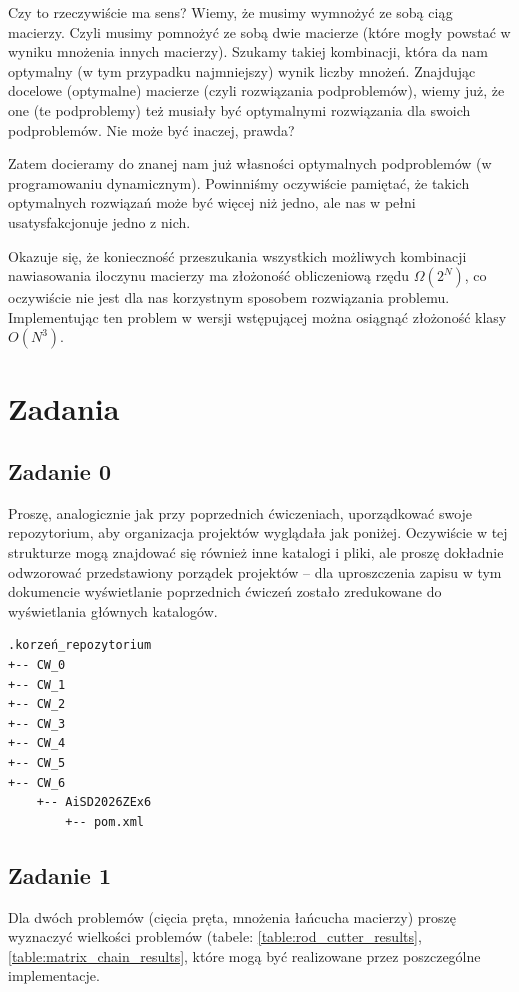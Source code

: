 \documentclass[twoside]{article}
\begin{document}
Czy to rzeczywiście ma sens?
Wiemy, że musimy wymnożyć ze sobą ciąg macierzy. Czyli musimy pomnożyć ze sobą dwie macierze (które 
mogły powstać w wyniku mnożenia innych macierzy). Szukamy takiej kombinacji, która da nam optymalny 
(w tym przypadku najmniejszy) wynik liczby mnożeń. Znajdując docelowe (optymalne) macierze (czyli 
rozwiązania podproblemów), wiemy już, że one (te podproblemy) też musiały być optymalnymi rozwiązania dla swoich podproblemów.
Nie może być inaczej, prawda?

Zatem docieramy do znanej nam już własności optymalnych podproblemów (w programowaniu dynamicznym).
Powinniśmy oczywiście pamiętać, że takich optymalnych rozwiązań może być więcej niż jedno, ale nas w pełni usatysfakcjonuje jedno z nich.

Okazuje się, że konieczność przeszukania wszystkich możliwych kombinacji nawiasowania iloczynu 
macierzy ma złożoność obliczeniową rzędu $\Omega(2^N)$, co oczywiście nie jest dla nas korzystnym 
sposobem rozwiązania problemu.
Implementując ten problem w wersji wstępującej można osiągnąć złożoność klasy $O(N^3)$. 
\newpage

\section{Zadania}

\subsection{Zadanie 0}
Proszę, analogicznie jak przy poprzednich ćwiczeniach,
uporządkować swoje repozytorium, aby organizacja projektów wyglądała jak poniżej. 
Oczywiście w tej strukturze mogą znajdować się również inne katalogi i pliki, ale proszę
dokładnie odwzorować przedstawiony porządek projektów -- dla uproszczenia zapisu w tym dokumencie
wyświetlanie poprzednich ćwiczeń zostało zredukowane do wyświetlania głównych katalogów.

\begin{verbatim}
.korzeń_repozytorium
+-- CW_0
+-- CW_1
+-- CW_2
+-- CW_3
+-- CW_4
+-- CW_5
+-- CW_6
    +-- AiSD2026ZEx6
        +-- pom.xml        
\end{verbatim}

\newpage

\subsection{Zadanie 1}
Dla dwóch problemów (cięcia pręta, mnożenia łańcucha macierzy) proszę wyznaczyć wielkości 
problemów (tabele: \ref{table:rod_cutter_results}, \ref{table:matrix_chain_results},
które mogą być realizowane przez poszczególne implementacje.
\end{document}
